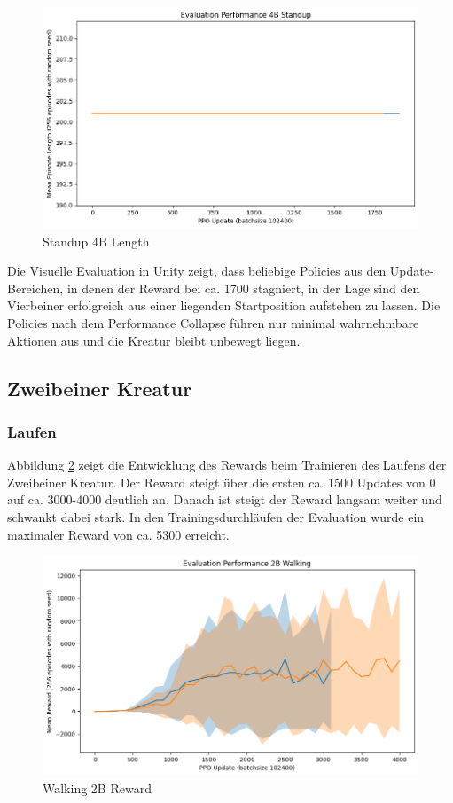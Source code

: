 \begin{figure}[ht]
    \centering
    \includegraphics[width=0.5\linewidth]{resources/img/results/Standup4B_Length.png}
    \caption{Standup 4B Length}\label{fig:Standup4B_Length}
\end{figure}

Die Visuelle Evaluation in Unity zeigt, dass beliebige Policies aus den Update-Bereichen, in denen der Reward bei ca. 1700 stagniert, in der Lage sind den Vierbeiner erfolgreich aus einer liegenden Startposition aufstehen zu lassen. Die Policies nach dem Performance Collapse führen nur minimal wahrnehmbare Aktionen aus und die Kreatur bleibt unbewegt liegen. 

\subsection{Zweibeiner Kreatur}

\subsubsection{Laufen}
Abbildung \ref{fig:Walking2B_Reward} zeigt die Entwicklung des Rewards beim Trainieren des Laufens der Zweibeiner Kreatur. Der Reward steigt über die ersten ca. 1500 Updates von 0 auf ca. 3000-4000 deutlich an. Danach ist steigt der Reward langsam weiter und schwankt dabei stark. In den Trainingsdurchläufen der Evaluation wurde ein maximaler Reward von ca. 5300 erreicht.

\begin{figure}[ht]
    \centering
    \includegraphics[width=0.5\linewidth]{resources/img/results/Walking2B_Reward.png}
    \caption{Walking 2B Reward}\label{fig:Walking2B_Reward}
\end{figure}

